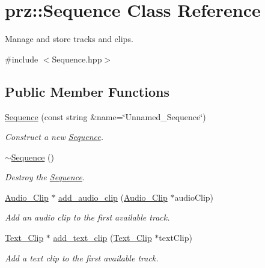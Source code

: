 \hypertarget{classprz_1_1_sequence}{}\section{prz\+::Sequence Class Reference}
\label{classprz_1_1_sequence}


Manage and store tracks and clips.  




{\ttfamily \#include $<$Sequence.\+hpp$>$}

\subsection*{Public Member Functions}
\begin{DoxyCompactItemize}
\item 
\mbox{\hyperlink{classprz_1_1_sequence_aec5dd736362277677b449619211ebe6f}{Sequence}} (const string \&name=\char`\"{}Unnamed\+\_\+\+Sequence\char`\"{})
\begin{DoxyCompactList}\small\item\em Construct a new \mbox{\hyperlink{classprz_1_1_sequence}{Sequence}}. \end{DoxyCompactList}\item 
\mbox{\hyperlink{classprz_1_1_sequence_aee7da60c0b19a1565ee44265a6738c43}{$\sim$\+Sequence}} ()
\begin{DoxyCompactList}\small\item\em Destroy the \mbox{\hyperlink{classprz_1_1_sequence}{Sequence}}. \end{DoxyCompactList}\item 
\mbox{\hyperlink{classprz_1_1_audio___clip}{Audio\+\_\+\+Clip}} $\ast$ \mbox{\hyperlink{classprz_1_1_sequence_a67a5cf8454902f91c6168516a3a04a75}{add\+\_\+audio\+\_\+clip}} (\mbox{\hyperlink{classprz_1_1_audio___clip}{Audio\+\_\+\+Clip}} $\ast$audio\+Clip)
\begin{DoxyCompactList}\small\item\em Add an audio clip to the first available track. \end{DoxyCompactList}\item 
\mbox{\hyperlink{classprz_1_1_text___clip}{Text\+\_\+\+Clip}} $\ast$ \mbox{\hyperlink{classprz_1_1_sequence_a66229b6f4cab505e8569e31dfe023e08}{add\+\_\+text\+\_\+clip}} (\mbox{\hyperlink{classprz_1_1_text___clip}{Text\+\_\+\+Clip}} $\ast$text\+Clip)
\begin{DoxyCompactList}\small\item\em Add a text clip to the first available track. \end{DoxyCompactList}\item 

\end{DoxyCompactItemize}
